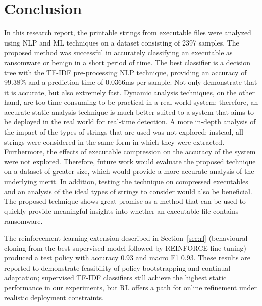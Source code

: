 \documentclass[conference]{IEEEtran}
\begin{document}
\section{Conclusion}
In this research report, the printable strings from executable files were analyzed using NLP and ML techniques on a dataset consisting of 2397 samples. The proposed method was successful in accurately classifying an executable as ransomware or benign in a short period of time. The best classifier is a decision tree with the TF-IDF pre-processing NLP technique, providing an accuracy of 99.38\% and a prediction time of 0.0366ms per sample. Not only demonstrate that it is accurate, but also extremely fast. Dynamic analysis techniques, on the other hand, are too time-consuming to be practical in a real-world system; therefore, an accurate static analysis technique is much better suited to a system that aims to be deployed in the real world for real-time detection. A more in-depth analysis of the impact of the types of strings that are used was not explored; instead, all strings were considered in the same form in which they were extracted. Furthermore, the effects of executable compression on the accuracy of the system were not explored. Therefore, future work would evaluate the proposed technique on a dataset of greater size, which would provide a more accurate analysis of the underlying merit. In addition, testing the technique on compressed executables and an analysis of the ideal types of strings to consider would also be beneficial. The proposed technique shows great promise as a method that can be used to quickly provide meaningful insights into whether an executable file contains ransomware.


The reinforcement-learning extension described in Section~\ref{sec:rl} (behavioural cloning from the best supervised model followed by REINFORCE fine-tuning) produced a test policy with accuracy 0.93 and macro F1 0.93. These results are reported to demonstrate feasibility of policy bootstrapping and continual adaptation; supervised TF-IDF classifiers still achieve the highest static performance in our experiments, but RL offers a path for online refinement under realistic deployment constraints.




\end{document}
